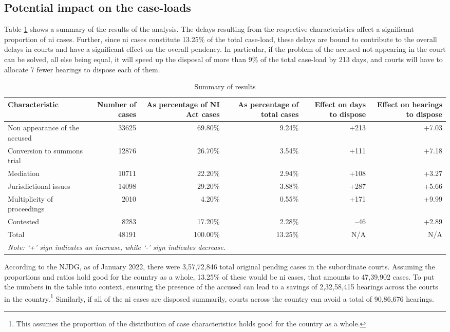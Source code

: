 \subsection{Potential impact on the case-loads}
\label{sec:impact-case-loads}

Table \ref{tab:summary_results} shows a summary of the results of the
analysis. The delays resulting from the respective characteristics
affect a significant proportion of \gls{ni} cases. Further, since
\gls{ni} cases constitute 13.25\% of the total case-load, these delays
are bound to contribute to the overall delays in courts and have a
significant effect on the overall pendency. In particular, if the
problem of the accused not appearing in the court can be solved, all
else being equal, it will speed up the disposal of more than 9\% of
the total case-load by 213 days, and courts will have to allocate 7
fewer hearings to dispose each of them.

{\footnotesize \begin{longtable}{@{}p{2.5cm}rrrrr}
  \caption{Summary of results}\label{tab:summary_results}\\
  \toprule
  \textbf{Characteristic} & \multicolumn{1}{p{2cm}}{\textbf{Number of cases}} &
  \multicolumn{1}{p{2cm}}{\textbf{As percentage of NI Act cases}}
  & \multicolumn{1}{p{2cm}}{\textbf{As percentage of total cases}}
  & \multicolumn{1}{p{2cm}}{\textbf{Effect on days to dispose}} &
  \multicolumn{1}{p{2cm}}{\textbf{Effect on hearings to dispose}}
  \\
  \midrule
  Non appearance of the accused & 33625 & 69.80\% & 9.24\% & +213 & +7.03 \\ \midrule
  Conversion to summons trial & 12876 & 26.70\% & 3.54\% & +111 & +7.18 \\ \midrule
  Mediation & 10711 & 22.20\% & 2.94\% & +108 & +3.27 \\ \midrule
  Jurisdictional issues & 14098 & 29.20\% & 3.88\% & +287 & +5.66 \\ \midrule
  Multiplicity of proceedings & 2010 & 4.20\% & 0.55\% & +171 & +9.99 \\ \midrule
  Contested & 8283 & 17.20\% & 2.28\% & --46 & +2.89 \\ \midrule
  Total & 48191 & 100.00\% & 13.25\% & N/A & N/A \\
  \bottomrule
  \multicolumn{6}{l}{{\footnotesize \emph{Note: `+' sign
        indicates an increase, while `-' sign indicates decrease.}}}\\
\end{longtable}
}
According to the NJDG, as of January 2022, there were 3,57,72,846
total original pending cases in the subordinate courts. Assuming the
proportions and ratios hold good for the country as a whole, 13.25\%
of these would be \gls{ni} cases, that amounts to 47,39,902 cases. To
put the numbers in the table into context, ensuring the presence of
the accused can lead to a savings of 2,32,58,415 hearings across the
courts in the country.\footnote{This assumes the proportion of the
  distribution of case characteristics holds good for the country as a
  whole.} Similarly, if all of the \gls{ni} cases are disposed
summarily, courts across the country can avoid a total of 90,86,676
hearings.

